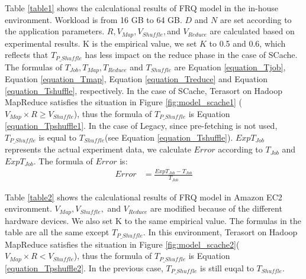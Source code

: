 {Table \ref{table1} shows the calculational results of FRQ model in the in-house environment. Workload is from 16 GB to 64 GB. \(D\) and \(N\) are set according to the application parameters. \(R, V_{Map}, V_{Shuffle},\)and \(V_{Reduce}\) are calculated based on experimental results. K is the empirical value, we set \(K\) to 0.5 and 0.6, which reflects that \(T_{P\_Shuffle}\) has less impact on the reduce phase in the case of SCache. The formulas of \(T_{Job}, T_{Map}, T_{Reduce}\) and \(T_{Shuffle}\) are Equation \ref{equation_Tjob}, Equation \ref{equation_Tmap}, Equation \ref{equation_Treduce} and Equation \ref{equation_Tshuffle}, respectively. In the case of SCache, Terasort on Hadoop MapReduce satisfies the situation in Figure \ref{fig:model_scache1} (\(V_{Map} \times R \ge V_{Shuffle}\)), thus the formula of \(T_{P\_Shuffle}\) is Equation \ref{equation_Tpshuffle1}. In the case of Legacy, since pre-fetching is not used, \(T_{P\_Shuffle}\) is equal to \(T_{Shuffle}\)(see Equation \ref{equation_Tshuffle}). \(ExpT_{Job}\) represents the actual experiment data, we calculate \(Error\) according to \(T_{Job}\) and \(ExpT_{Job}\). The formula of \(Error\) is:
\begin{equation}
	\label{equation_error}
	\begin{aligned}
		Error &= \frac{ExpT_{Job} - T_{Job}}{T_{Job}}
	\end{aligned}
\end{equation}

Table \ref{table2} shows the calculational results of FRQ model in Amazon EC2 environment. \(V_{Map}, V_{Shuffle},\) and \(V_{Reduce}\) are modified because of the different hardware devices. We also set K to the same empirical value. The formulas in the table are all the same except \(T_{P\_Shuffle}\). In this environment, Terasort on Hadoop MapReduce satisfies the situation in Figure \ref{fig:model_scache2}(\(V_{Map} \times R < V_{Shuffle}\)), thus the formula of \(T_{P\_Shuffle}\) is Equation \ref{equation_Tpshuffle2}. In the previous case, \(T_{P\_Shuffle}\) is still euqal to \(T_{Shuffle}\).

}
